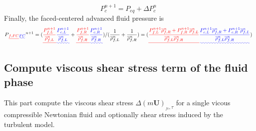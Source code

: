 \documentclass[preprint,12pt]{elsarticle}
\providecommand{\DIFadd}[1]{{\protect\color{blue}\uwave{#1}}} %
\providecommand{\DIFdel}[1]{{\protect\color{red}\sout{#1}}}                      %
\providecommand{\DIFaddbegin}{} %
\providecommand{\DIFaddend}{} %
\providecommand{\DIFdelbegin}{} %
\providecommand{\DIFdelend}{} %
\newcommand{\DIFscaledelfig}{0.5}
\newlength{\DIFdelgraphicswidth} %
\newlength{\DIFdelgraphicsheight} %
\newcommand{\DIFaddincludegraphics}[2][]{{\color{blue}\fbox{\DIFOincludegraphics[#1]{#2}}}} %
\newcommand{\DIFdelincludegraphics}[2][]{%
\sbox{\DIFdelgraphicsbox}{\DIFOincludegraphics[#1]{#2}}%
\settoboxwidth{\DIFdelgraphicswidth}{\DIFdelgraphicsbox} %
\settoboxtotalheight{\DIFdelgraphicsheight}{\DIFdelgraphicsbox} %
\scalebox{\DIFscaledelfig}{%
\parbox[b]{\DIFdelgraphicswidth}{\usebox{\DIFdelgraphicsbox}\\[-\baselineskip] \rule{\DIFdelgraphicswidth}{0em}}\llap{\resizebox{\DIFdelgraphicswidth}{\DIFdelgraphicsheight}{%
\setlength{\unitlength}{\DIFdelgraphicswidth}%
\begin{picture}(1,1)%
\thicklines\linethickness{2pt} %
{\color[rgb]{1,0,0}\put(0,0){\framebox(1,1){}}}%
{\color[rgb]{1,0,0}\put(0,0){\line( 1,1){1}}}%
{\color[rgb]{1,0,0}\put(0,1){\line(1,-1){1}}}%
\end{picture}%
}\hspace*{3pt}}} %
} %
\DeclareRobustCommand{\DIFaddbegin}{\DIFOaddbegin \let\includegraphics\DIFaddincludegraphics} %
\DeclareRobustCommand{\DIFaddend}{\DIFOaddend \let\includegraphics\DIFOincludegraphics} %
\DeclareRobustCommand{\DIFdelbegin}{\DIFOdelbegin \let\includegraphics\DIFdelincludegraphics} %
\DeclareRobustCommand{\DIFdelend}{\DIFOaddend \let\includegraphics\DIFOincludegraphics} %
\begin{document}
\DIFaddend \begin{equation}
  P_c^{n+1} = P_{eq} + \Delta P_c^{n}
\end{equation}
%
%
Finally, the faced-centered advanced fluid pressure is
%
%
\begin{equation}
    P\DIFdelbegin \DIFdel{_{f,FC}}\DIFdelend \DIFaddbegin \DIFadd{_{FC}}\DIFaddend ^{n+1} = (\DIFdelbegin \DIFdel{\frac{P_{f,L}^{n+1}}{\overline{\rho}_{f,L}^n} }\DIFdelend \DIFaddbegin \DIFadd{\frac{P_{c,L}^{n+1}}{\overline{\rho}_{f,L}^n} }\DIFaddend + \DIFdelbegin \DIFdel{\frac{P_{f,R}^{n+1}}{\overline{\rho}_{f,R}^n}}\DIFdelend \DIFaddbegin \DIFadd{\frac{P_{c,R}^{n+1}}{\overline{\rho}_{f,R}^n}}\DIFaddend ) / (\frac{1}{\overline{\rho}_{f,L}^n} + \frac{1}{\overline{\rho}_{f,R}^n}) = (\DIFdelbegin \DIFdel{\frac{P_{f,L}^{n+1} \overline{\rho}_{f,R}^n + P_{f,R}^{n+1} \overline{\rho}_{f,L}^n}{\overline{\rho}_{f,L}^n \overline{\rho}_{f,R}^n}}\DIFdelend \DIFaddbegin \DIFadd{\frac{P_{c,L}^{n+1} \overline{\rho}_{f,R}^n + P_{c,R}^{n+1} \overline{\rho}_{f,L}^n}{\overline{\rho}_{f,L}^n \overline{\rho}_{f,R}^n}}\DIFaddend )
\end{equation}
%
%
\subsection{\textsf{Compute viscous shear stress term of the fluid phase}}
This part compute the viscous shear stress $\Delta (m \pmb{U})_{_{fc},\tau}$ for a single vicous compressible Newtonian fluid and optionally shear stress induced by the turbulent model.
%
%
\end{document}
